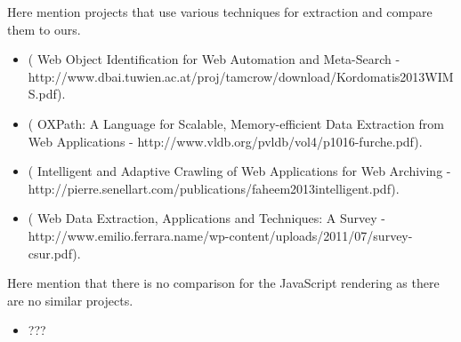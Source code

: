 Here mention projects that use various techniques for extraction and compare them to ours.
\begin{itemize}
  \item ( Web Object Identification for Web Automation and Meta-Search - http://www.dbai.tuwien.ac.at/proj/tamcrow/download/Kordomatis2013WIMS.pdf).
  \item ( OXPath: A Language for Scalable, Memory-efficient Data Extraction from Web Applications - http://www.vldb.org/pvldb/vol4/p1016-furche.pdf).
  \item ( Intelligent and Adaptive Crawling of Web Applications for Web Archiving - http://pierre.senellart.com/publications/faheem2013intelligent.pdf).
  \item ( Web Data Extraction, Applications and Techniques: A Survey - http://www.emilio.ferrara.name/wp-content/uploads/2011/07/survey-csur.pdf).
\end{itemize}

Here mention that there is no comparison for the JavaScript rendering as there are no similar projects.
\begin{itemize}
  \item ???
\end{itemize}
